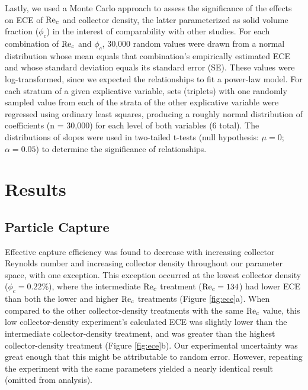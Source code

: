 \documentclass[geosciences,article,submit,moreauthors,pdftex]{Definitions/mdpi}
\begin{document}
Lastly, we used a Monte Carlo approach to assess the significance of the effects on ECE of $\mathrm{Re}_c$ and collector density, the latter parameterized as solid volume fraction ($\phi_c$) in the interest of comparability with other studies. For each combination of $\mathrm{Re}_c$ and $\phi_c$, 30,000 random values were drawn from a normal distribution whose mean equals that combination's empirically estimated ECE and whose standard deviation equals its standard error (SE). These values were log-transformed, since we expected the relationships to fit a power-law model. For each stratum of a given explicative variable, sets (triplets) with one randomly sampled value from each of the strata of the other explicative variable were regressed using ordinary least squares, producing a roughly normal distribution of coefficients (n = 30,000) for each level of both variables (6 total). The distributions of slopes were used in two-tailed t-tests (null hypothesis: $\mu = 0$; $\alpha = 0.05$) to determine the significance of relationships.

\section{Results}

\subsection{Particle Capture}

Effective capture efficiency was found to decrease with increasing collector Reynolds number and increasing collector density throughout our parameter space, with one exception. This exception occurred at the lowest collector density ($\phi_c = 0.22\%$), where the intermediate $\mathrm{Re}_c$ treatment ($\mathrm{Re}_c = 134$) had lower ECE than both the lower and higher $\mathrm{Re}_c$ treatments (Figure \ref{fig:ece}a). When compared to the other collector-density treatments with the same $\mathrm{Re}_c$ value, this low collector-density experiment's calculated ECE was slightly lower than the intermediate collector-density treatment, and was greater than the highest collector-density treatment (Figure \ref{fig:ece}b). Our experimental uncertainty was great enough that this might be attributable to random error. However, repeating the experiment with the same parameters yielded a nearly identical result (omitted from analysis).
\end{document}
